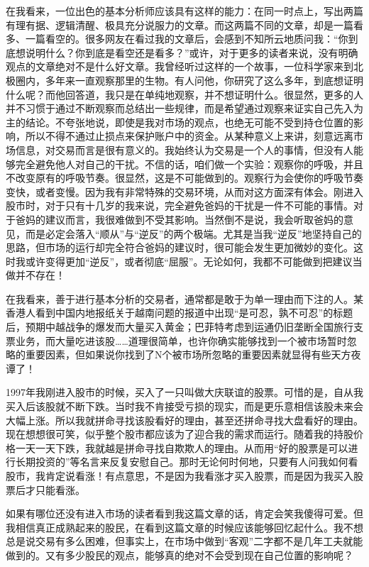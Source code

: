 在我看来，一位出色的基本分析师应该具有这样的能力：在同一时点上，写出两篇有理有据、逻辑清醒、极具充分说服力的文章。而这两篇不同的文章，却是一篇看多、一篇看空的。很多网友在看过我的文章后，会感到不知所云地质问我：“你到底想说明什么？你到底是看空还是看多？”或许，对于更多的读者来说，没有明确观点的文章绝对不是什么好文章。我曾经听过这样的一个故事，一位科学家来到北极圈内，多年来一直观察那里的生物。有人问他，你研究了这么多年，到底想证明什么呢？而他回答道，我只是在单纯地观察，并不想证明什么。很显然，更多的人并不习惯于通过不断观察而总结出一些规律，而是希望通过观察来证实自己先入为主的结论。不夸张地说，即使是我对市场的观点，也绝无可能不受到持仓位置的影响，所以不得不通过止损点来保护账户中的资金。从某种意义上来讲，刻意远离市场信息，对交易而言是很有意义的。我始终认为交易是一个人的事情，但没有人能够完全避免他人对自己的干扰。不信的话，咱们做一个实验：观察你的呼吸，并且不改变原有的呼吸节奏。很显然，这是不可能做到的。观察行为会使你的呼吸节奏变快，或者变慢。因为我有非常特殊的交易环境，从而对这方面深有体会。刚进入股市时，对于只有十几岁的我来说，完全避免爸妈的干扰是一件不可能的事情。对于爸妈的建议而言，我很难做到不受其影响。当然倒不是说，我会听取爸妈的意见，而是必定会落入“顺从”与“逆反”的两个极端。尤其是当我“逆反”地坚持自己的思路，但市场的运行却完全符合爸妈的建议时，很可能会发生更加微妙的变化。这时我或许变得更加“逆反”，或者彻底“屈服”。无论如何，我都不可能做到把建议当做并不存在！

在我看来，善于进行基本分析的交易者，通常都是敢于为单一理由而下注的人。某香港人看到中国内地报纸关于越南问题的报道中出现“是可忍，孰不可忍”的标题后，预期中越战争的爆发而大量买入黄金；巴菲特考虑到运通仍旧垄断全国旅行支票业务，而大量吃进该股……道理很简单，也许你确实能够找到一个被市场暂时忽略的重要因素，但如果说你找到了N个被市场所忽略的重要因素就显得有些天方夜谭了！

1997年我刚进入股市的时候，买入了一只叫做大庆联谊的股票。可惜的是，自从我买入后该股就不断下跌。当时我不肯接受亏损的现实，而是更乐意相信该股未来会大幅上涨。所以我就拼命寻找该股看好的理由，甚至还拼命寻找大盘看好的理由。现在想想很可笑，似乎整个股市都应该为了迎合我的需求而运行。随着我的持股价格一天一天下跌，我就越是拼命寻找自欺欺人的理由。从而用“好的股票是可以进行长期投资的”等名言来反复安慰自己。那时无论何时何地，只要有人问我如何看股市，我肯定说看涨！有点意思，不是因为我看涨才买入股票，而是因为我买入股票后才只能看涨。

如果有哪位还没有进入市场的读者看到我这篇文章的话，肯定会笑我傻得可爱。但我相信真正成熟起来的股民，在看到这篇文章的时候应该能够回忆起什么。我不想总是说交易有多么困难，但事实上，在市场中做到“客观”二字都不是几年工夫就能做到的。又有多少股民的观点，能够真的绝对不会受到现在自己位置的影响呢？

